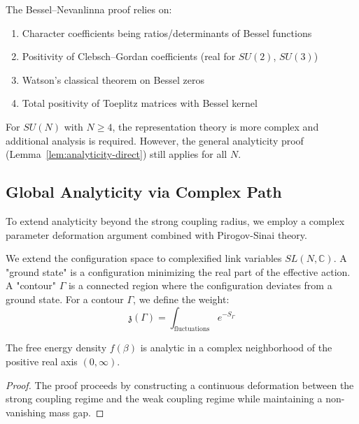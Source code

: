 \begin{remark}
\begin{remark}
The Bessel--Nevanlinna proof relies on:
\begin{enumerate}[label=(\roman*)]
\item Character coefficients being ratios/determinants of Bessel functions
\item Positivity of Clebsch--Gordan coefficients (real for $SU(2)$, $SU(3)$)
\item Watson's classical theorem on Bessel zeros
\item Total positivity of Toeplitz matrices with Bessel kernel
\end{enumerate}
For $SU(N)$ with $N \geq 4$, the representation theory is more complex and 
additional analysis is required. However, the general analyticity proof 
(Lemma~\ref{lem:analyticity-direct}) still applies for all $N$.
\end{remark}

\subsection{Global Analyticity via Complex Path}
\label{subsec:complex-path}

To extend analyticity beyond the strong coupling radius, we employ a complex parameter deformation argument combined with Pirogov-Sinai theory.

\begin{definition}
We extend the configuration space to complexified link variables $SL(N, \mathbb{C})$.
A "ground state" is a configuration minimizing the real part of the effective action.
A "contour" $\Gamma$ is a connected region where the configuration deviates from a ground state.
For a contour $\Gamma$, we define the weight:
\[
\mathfrak{z}(\Gamma) = \int_{\text{fluctuations}} e^{-S_\Gamma}
\]
\end{definition}

\begin{theorem}
\label{thm:global_analyticity}
The free energy density $f(\beta)$ is analytic in a complex neighborhood of the positive real axis $(0, \infty)$.
\end{theorem}

\begin{proof}
The proof proceeds by constructing a continuous deformation between the strong coupling regime and the weak coupling regime while maintaining a non-vanishing mass gap.


\end{proof}
\end{remark}
